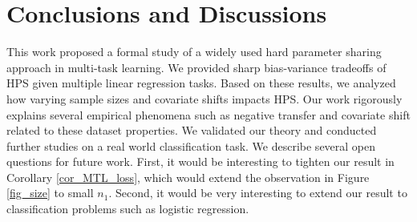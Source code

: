\section{Conclusions and Discussions}\label{sec_conclude}

This work proposed a formal study of a widely used hard parameter sharing approach in multi-task learning.
We provided sharp bias-variance tradeoffs of HPS given multiple linear regression tasks.
Based on these results, we analyzed how varying sample sizes and covariate shifts impacts HPS.
Our work rigorously explains several empirical phenomena such as negative transfer and covariate shift related to these dataset properties.
We validated our theory and conducted further studies on a real world classification task.
We describe several open questions for future work.
First, it would be interesting to tighten our result in Corollary \ref{cor_MTL_loss}, which would extend the observation in Figure \ref{fig_size} to small $n_1$.
Second, it would be very interesting to extend our result to classification problems such as logistic regression.
